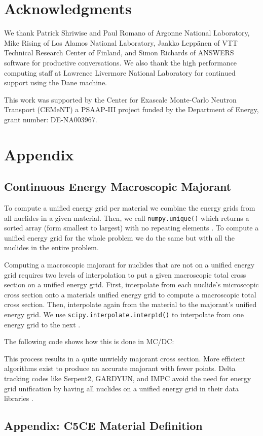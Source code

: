 \section*{Acknowledgments}
We thank Patrick Shriwise and Paul Romano of Argonne National Laboratory, Mike Rising of Los Alamos National Laboratory, Jaakko Leppänen of VTT Technical Research Center of Finland, and Simon Richards of ANSWERS software for productive conversations.
We also thank the high performance computing staff at Lawrence Livermore National Laboratory for continued support using the Dane machine. 

This work was supported by the Center for Exascale Monte-Carlo Neutron Transport (CEMeNT) a PSAAP-III project funded by the Department of Energy, grant number: DE-NA003967.

\section*{Appendix}

\subsection*{Continuous Energy Macroscopic Majorant}
\label{app:majorant}

To compute a unified energy grid per material we combine the energy grids from all nuclides in a given material. 
Then, we call \texttt{numpy.unique()} which returns a sorted array (form smallest to largest) with no repeating elements \cite{van_der_walt_numpy_2011}.
To compute a unified energy grid for the whole problem we do the same but with all the nuclides in the entire problem.

Computing a macroscopic majorant for nuclides that are not on a unified energy grid requires two levels of interpolation to put a given macroscopic total cross section on a unified energy grid.
First, interpolate from each nuclide's microscopic cross section onto a materials unified energy grid to compute a macroscopic total cross section.
Then, interpolate again from the material to the majorant's unified energy grid.
We use \texttt{scipy.interpolate.interp1d()} to interpolate from one energy grid to the next \cite{2020SciPy-NMeth:a}. 

The following code shows how this is done in MC/DC:



This process results in a quite unwieldy majorant cross section.
More efficient algorithms exist to produce an accurate majorant with fewer points.
Delta tracking codes like Serpent2, GARDYUN, and IMPC avoid the need for energy grid unification by having all nuclides on a unified energy grid in their data libraries \cite{leppanen_2010_burnup, molnar_gpu_based_2019, fang_development_2022}.


\newpage

\subsection*{Appendix: C5CE Material Definition}
\label{app:c5ce_mat}
